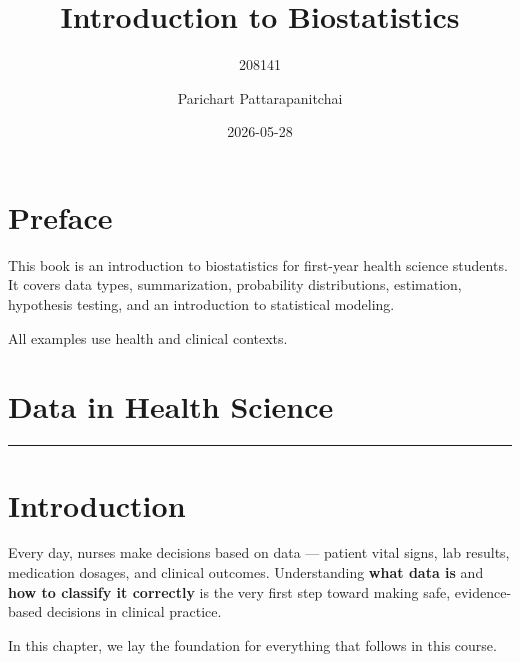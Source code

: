 \documentclass[
  12pt,
  letterpaper,
]{book}
\title{Introduction to Biostatistics}
\subtitle{208141}
\author{Parichart Pattarapanitchai}
\date{2026-05-28}
\renewcommand*\contentsname{Table of contents}
\newcommand\contentsname{Table of contents}
\begin{document}
\frontmatter
\maketitle

\renewcommand*\contentsname{Table of contents}
{
\setcounter{tocdepth}{2}
\tableofcontents
}

\mainmatter
{}

\chapter*{Preface}\label{preface}


This book is an introduction to biostatistics for first-year health
science students. It covers data types, summarization, probability
distributions, estimation, hypothesis testing, and an introduction to
statistical modeling.

All examples use health and clinical contexts.


\chapter{Data in Health Science}\label{data-in-health-science}

\begin{center}\rule{0.5\linewidth}{0.5pt}\end{center}


\chapter*{Introduction}\label{introduction}


\begin{tcolorbox}[enhanced jigsaw, arc=.35mm, bottomrule=.15mm, bottomtitle=1mm, breakable, colback=white, colbacktitle=quarto-callout-note-color!10!white, colframe=quarto-callout-note-color-frame, coltitle=black, left=2mm, leftrule=.75mm, opacityback=0, opacitybacktitle=0.6, rightrule=.15mm, title={🏥 Why Does This Matter for Nurses?}, titlerule=0mm, toprule=.15mm, toptitle=1mm]

Every day, nurses make decisions based on data --- patient vital signs,
lab results, medication dosages, and clinical outcomes. Understanding
\textbf{what data is} and \textbf{how to classify it correctly} is the
very first step toward making safe, evidence-based decisions in clinical
practice.

In this chapter, we lay the foundation for everything that follows in
this course.

\end{tcolorbox}
\end{document}
